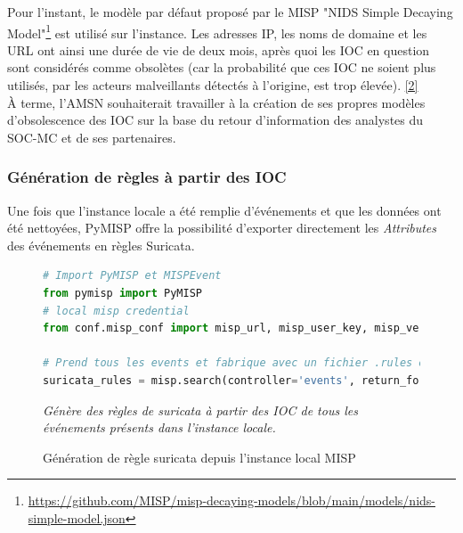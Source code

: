 \vspace{1em}

Pour l'instant, le modèle par défaut proposé par le MISP "NIDS Simple Decaying Model"\footnote{\url{https://github.com/MISP/misp-decaying-models/blob/main/models/nids-simple-model.json}} est utilisé sur l'instance. Les adresses IP, les noms de domaine et les URL ont ainsi une durée de vie de deux mois, après quoi les IOC en question sont considérés comme obsolètes (car la probabilité que ces IOC ne soient plus utilisés, par les acteurs malveillants détectés à l'origine, est trop élevée). \hyperref[biblio]{[2]}\\

À terme, l'AMSN souhaiterait travailler à la création de ses propres modèles d'obsolescence des IOC sur la base du retour d'information des analystes du SOC-MC et de ses partenaires.

\newpage

\subsubsection{Génération de règles à partir des IOC}
\label{chap3:genRulesEvents}
\vspace{0.5em}

Une fois que l'instance locale a été remplie d'événements et que les données ont été nettoyées, PyMISP offre la possibilité d'exporter directement les \textit{Attributes} des événements en règles Suricata.\\

\vspace{1em}

\begin{figure}[h]%
    \center%
\begin{lstlisting}[language=Python]
# Import PyMISP et MISPEvent
from pymisp import PyMISP
# local misp credential
from conf.misp_conf import misp_url, misp_user_key, misp_verifycert

# Prend tous les events et fabrique avec un fichier .rules exploitable
suricata_rules = misp.search(controller='events', return_format="suricata")
\end{lstlisting}
{\small
    \textit{Génère des règles de suricata à partir des IOC de tous les événements présents dans l'instance locale.}
    }
    \caption[Génération de règle Suricata depuis l'instance local MISP]{Génération de règle suricata depuis l'instance local MISP}\label{fig:CreateSuricataMISP}
\end{figure}

